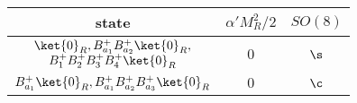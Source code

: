 \begin{tabular}{|c|c|c|}
    \hline    state & $\alpha' M^2_R / 2$ & $SO(8)$ \\ \hline
    \multirow{2}{*}{$\begin{array}{c} 
        \ket{0}_{R}, B^+_{a_1}B^+_{a_2}\ket{0}_{R}, \\ 
        B^+_{1}B^+_{2}B^+_{3}B^+_{4} \ket{0}_{R} 
    \end{array}$} & \multirow{2}{*}{$0$} & \multirow{2}{*}{$\s$} \\ 
    & & \\ \hline
    $B^+_{a_1} \ket{0}_{R}, B^+_{a_1}B^+_{a_2}B^+_{a_3}\ket{0}_{R}$   & $0$   & $\c$\\ \hline
\end{tabular}